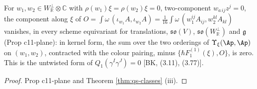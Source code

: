 \begin{proposition}
\label{prop:qs-plane}
For $w_1,w_2\in W^\perp_{\mathbb R}\otimes\mathbb C$ with $\rho(w_1)\xi=\rho(w_2)\xi=0$, two-component $w_{a\,ij}z^j=0$, the component along $\xi$ of $O=\int\omega\,(\iota_{w_1}A,\iota_{w_2}A)=\tfrac1{16}\int\omega\,(w_1^{ij}A_{ij},w_2^{kl}A_{kl})$ vanishes, in every scheme equivariant for translations, $\mathfrak{so}(V)$, $\mathfrak{so}(W^\perp_{\mathbb R})$ and $\mathfrak g$ (Prop c11-plane): in kernel form, the sum over the two orderings of $\Upsilon_\xi(\Ap,\Ap)$ on $(w_1,w_2)$, contracted with the colour pairing, minus $\{\hbar F_1^{(1)}(\xi),O\}$, is zero. This is the untwisted form of $Q_1(\gamma^I\gamma^J)=0$ [BK, (3.11), (3.77)].
\end{proposition}

\begin{proof}
Prop c11-plane and Theorem \ref{thm:qs-classes} (iii).
\end{proof}

